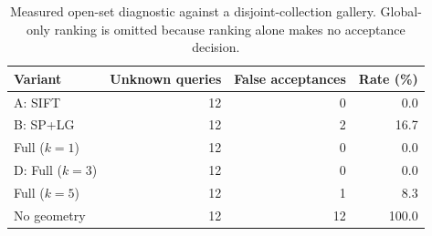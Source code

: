 \begin{table}[htbp]\centering\small
\caption{Measured open-set diagnostic against a disjoint-collection gallery. Global-only ranking is omitted because ranking alone makes no acceptance decision.}\label{tab:open-set}
\begin{tabular}{lrrr}
\toprule
Variant & Unknown queries & False acceptances & Rate (\%) \\
\midrule
A: SIFT & 12 & 0 & 0.0 \\
B: SP+LG & 12 & 2 & 16.7 \\
Full ($k=1$) & 12 & 0 & 0.0 \\
D: Full ($k=3$) & 12 & 0 & 0.0 \\
Full ($k=5$) & 12 & 1 & 8.3 \\
No geometry & 12 & 12 & 100.0 \\
\bottomrule
\end{tabular}\end{table}

